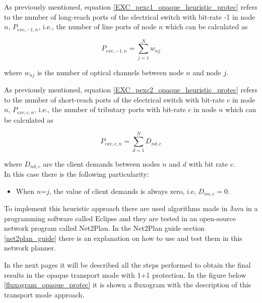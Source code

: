 As previously mentioned, equation \ref{EXC_pexc1_opaque_heuristic_protec} refers to the number of long-reach ports of the electrical switch with bit-rate -1 in node $n$, $P_{exc,-1,n}$, i.e., the number of line ports of node $n$ which can be calculated as

\begin{equation}
P_{exc,-1,n} = \sum_{j=1}^{N} w_{nj}
\label{EXC_pexc1_opaque_heuristic_protec}
\end{equation}

\noindent
where $w_{nj}$ is the number of optical channels between node $n$ and node $j$.

\newpage
\vspace{11pt}
As previously mentioned, equation \ref{EXC_pexc2_opaque_heuristic_protec} refers to the number of short-reach ports of the electrical switch with bit-rate $c$ in node $n$, $P_{exc,c,n}$, i.e., the number of tributary ports with bit-rate $c$ in node $n$ which can be calculated as

\begin{equation}
P_{exc,c,n} = \sum_{d=1}^{N} D_{nd,c}
\label{EXC_pexc2_opaque_heuristic_protec}
\end{equation}

\noindent
where $D_{nd,c}$ are the client demands between nodes $n$ and $d$ with bit rate $c$.\\

\noindent
In this case there is the following particularity:

\begin{itemize}
  \item When $n$=$j$, the value of client demands is always zero, i.e, $D_{nn,c}=0$.
\end{itemize}

\vspace{11pt}
To implement this heuristic approach there are used algorithms made in Java in a programming software called Eclipse and they are tested in an open-source network program called Net2Plan. In the Net2Plan guide section \ref{net2plan_guide} there is an explanation on how to use and test them in this network planner.

In the next pages it will be described all the steps performed to obtain the final results in the opaque transport mode with 1+1 protection. In the figure below \ref{fluxogram_opaque_protec} it is shown a fluxogram with the description of this transport mode approach.

